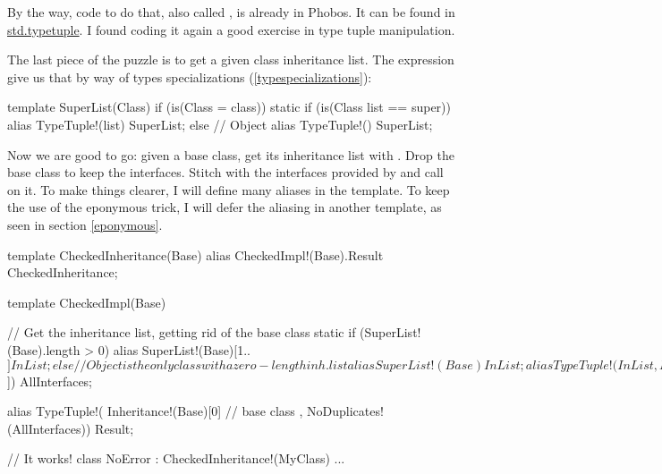 
By the way, code to do that, also called , is already in Phobos. It can be found in \href{www.d-programming-language.org/phobos/std_typetuple.html}{std.typetuple}. I found coding it again a good exercise in type tuple manipulation.

The last piece of the puzzle is to get a given class inheritance list. The  expression give us that by way of types specializations (\ref{typespecializations}):

\begin{dcode}
template SuperList(Class) if (is(Class = class))
{
    static if (is(Class list == super))
        alias TypeTuple!(list) SuperList;
    else // Object
        alias TypeTuple!() SuperList;
}
\end{dcode}

Now we are good to go: given a base class, get its inheritance list with . Drop the base class to keep the interfaces. Stitch with the interfaces provided by  and call  on it. To make things clearer, I will define many aliases in the template. To keep the use of the eponymous trick, I will defer the aliasing in another template, as seen in section \ref{eponymous}.

\begin{dcode}
template CheckedInheritance(Base)
{
    alias CheckedImpl!(Base).Result CheckedInheritance;
}

template CheckedImpl(Base)
{
    // Get the inheritance list, getting rid of the base class
    static if (SuperList!(Base).length > 0)
        alias SuperList!(Base)[1..$] InList;
    else // Object is the only class with a zero-length inh. list
        alias SuperList!(Base)       InList;

    alias TypeTuple!( InList
                    , Inheritance!(Base)[1..$]) AllInterfaces;

    alias TypeTuple!( Inheritance!(Base)[0] // base class
                    , NoDuplicates!(AllInterfaces)) Result;
} 

// It works!
class NoError : CheckedInheritance!(MyClass) { ... }
\end{dcode}



